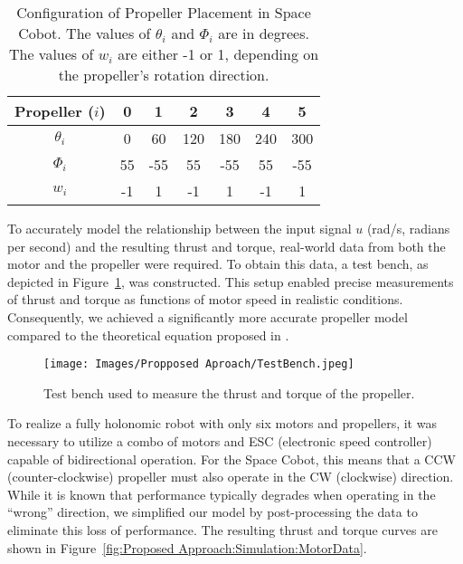 \begin{table}[H]
\centering
\begin{tabular}{c|cccccc}
Propeller (\(i\)) & 0  & 1   & 2   & 3    & 4   & 5   \\ \hline
\(\theta_{i}\)     & 0  & 60  & 120 & 180  & 240 & 300 \\
\(\Phi_{i}\)       & 55 & -55 & 55  & -55  & 55  & -55 \\
\(w_{i}\)          & -1 & 1   & -1  & 1    & -1  & 1   \\ \hline
\end{tabular}
\caption{Configuration of Propeller Placement in Space Cobot. The values of \( \theta_{i} \) and \(\Phi_{i} \) are in degrees. The values of \(w_{i}\) are either -1 or 1, depending on the propeller's rotation direction.}
\label{tab:Proposed Aproach: Space Cobot Motor and propeller configuration}
\end{table}

To accurately model the relationship between the input signal \( u \) (rad/s, radians per second) and the resulting thrust and torque, real-world data from both the motor and the propeller were required. To obtain this data, a test bench, as depicted in Figure~\ref{fig:Proposed Approach:Simulator:Testbench}, was constructed. This setup enabled precise measurements of thrust and torque as functions of motor speed in realistic conditions. Consequently, we achieved a significantly more accurate propeller model compared to the theoretical equation proposed in \cite{martin2010true}.

\begin{figure}[H]
    \centering
    \texttt{[image: Images/Propposed Aproach/TestBench.jpeg]}
    \caption{Test bench used to measure the thrust and torque of the propeller.}
    \label{fig:Proposed Approach:Simulator:Testbench}
\end{figure}

To realize a fully holonomic robot with only six motors and propellers, it was necessary to utilize a combo of motors and ESC (electronic speed controller) capable of bidirectional operation. For the Space Cobot, this means that a CCW (counter-clockwise) propeller must also operate in the CW (clockwise) direction. While it is known that performance typically degrades when operating in the \enquote{wrong} direction, we simplified our model by post-processing the data to eliminate this loss of performance. The resulting thrust and torque curves are shown in Figure~\ref{fig:Proposed Approach:Simulation:MotorData}.

